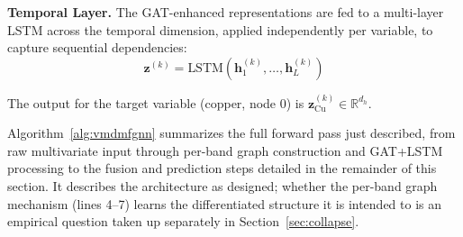 \documentclass[journal]{IEEEtran}
\begin{document}
\textbf{Temporal Layer.} The GAT-enhanced representations are fed to a multi-layer LSTM across the temporal dimension, applied independently per variable, to capture sequential dependencies:
\begin{equation}
\mathbf{z}^{(k)} = \text{LSTM}(\mathbf{h}^{(k)}_{1}, \ldots, \mathbf{h}^{(k)}_{L})
\end{equation}

The output for the target variable (copper, node 0) is $\mathbf{z}^{(k)}_{\text{Cu}} \in \mathbb{R}^{d_h}$.

Algorithm~\ref{alg:vmdmfgnn} summarizes the full forward pass just described, from raw multivariate input through per-band graph construction and GAT+LSTM processing to the fusion and prediction steps detailed in the remainder of this section. It describes the architecture as designed; whether the per-band graph mechanism (lines 4--7) learns the differentiated structure it is intended to is an empirical question taken up separately in Section~\ref{sec:collapse}.
\end{document}
